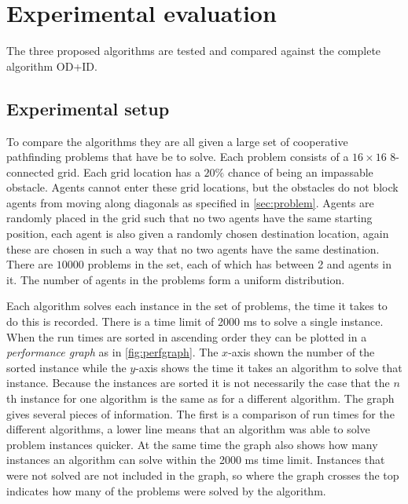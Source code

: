 \section{Experimental evaluation}\label{sec:results}

The three proposed algorithms are tested and compared against the complete
algorithm OD+ID.

\subsection{Experimental setup}
To compare the algorithms they are all given a large set of cooperative
pathfinding problems that have be to solve. Each problem consists of a $16
\times 16$ 8-connected grid. Each grid location has a $20\%$ chance of being an
impassable obstacle. Agents cannot enter these grid locations, but the
obstacles do not block agents from moving along diagonals as specified in
\autoref{sec:problem}. Agents are randomly placed in the grid such that no two
agents have the same starting position, each agent is also given a randomly
chosen destination location, again these are chosen in such a way that no two
agents have the same destination. There are $10000$ problems in the set, each
of which has between 2 and \agentsupb agents in it. The number of agents in the
problems form a uniform distribution.

Each algorithm solves each instance in the set of problems, the time it takes
to do this is recorded. There is a time limit of 2000 ms to solve a single
instance. When the run times are sorted in ascending order they can be plotted
in a \emph{performance graph} as in \autoref{fig:perfgraph}. The $x$-axis shown
the number of the sorted instance while the $y$-axis shows the time it takes an
algorithm to solve that instance. Because the instances are sorted it is not
necessarily the case that the $n$th instance for one algorithm is the same as
for a different algorithm. The graph gives several pieces of information. The
first is a comparison of run times for the different algorithms, a lower line
means that an algorithm was able to solve problem instances quicker. At the
same time the graph also shows how many instances an algorithm can solve within
the 2000 ms time limit. Instances that were not solved are not included in the
graph, so where the graph crosses the top indicates how many of the problems
were solved by the algorithm.


